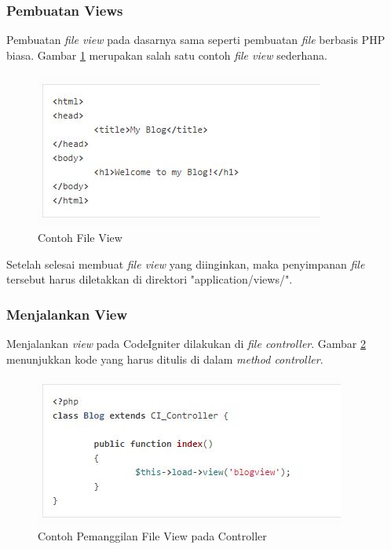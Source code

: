 	\subsubsection{Pembuatan Views}
	\label{subsub: pembuatanView}
	
	Pembuatan \textit{file view} pada dasarnya sama seperti pembuatan \textit{file} berbasis PHP biasa. Gambar \ref{fig:view} merupakan salah satu contoh \textit{file view} sederhana.
	
	\begin{figure}[H]
		\centering
		\includegraphics[scale=1]{Gambar/view}
		\caption{Contoh File View}
		\label{fig:view}
	\end{figure}
	
	Setelah selesai membuat \textit{file view} yang diinginkan, maka penyimpanan \textit{file} tersebut harus diletakkan di direktori "application/views/".
	
	\subsubsection{Menjalankan View}
	\label{subsub: menjalankanView}
	
	Menjalankan \textit{view} pada CodeIgniter dilakukan di \textit{file controller}. Gambar \ref{fig:controllerView} menunjukkan kode yang harus ditulis di dalam \textit{method controller}.
	
	\begin{figure}[H]
		\centering
		\includegraphics[scale=1]{Gambar/controllerView}
		\caption{Contoh Pemanggilan File View pada Controller}
		\label{fig:controllerView}
	\end{figure}
	
